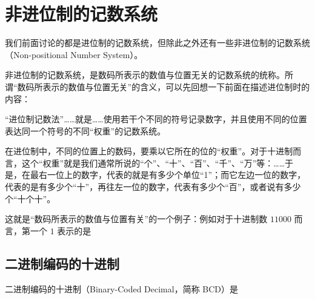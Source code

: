 \section{非进位制的记数系统}\label{sec:NumberSystemBasics/NonPositional}
    我们前面讨论的都是进位制的记数系统，但除此之外还有一些非进位制的记数系统（Non-positional Number System）。

    非进位制的记数系统，是数码所表示的数值与位置无关的记数系统的统称。所谓“数码所表示的数值与位置无关”的含义，可以先回想一下前面在描述进位制时的内容：

    \begin{displayquote}
        “进位制记数法”……就是……使用若干个不同的符号记录数字，并且使用不同的位置表达同一个符号的不同“权重”的记数系统。

        在进位制中，不同的位置上的数码，要乘以它所在的位的“权重”。对于十进制而言，这个“权重”就是我们通常所说的“个”、“十”、“百”、“千”、“万”等：……于是，在最右一位上的数字，代表的就是有多少个单位“1”；而它左边一位的数字，代表的是有多少个“十”，再往左一位的数字，代表有多少个“百”，或者说有多少个“十个十”。
    \end{displayquote}

    这就是“数码所表示的数值与位置有关”的一个例子：例如对于十进制数 $11000$ 而言，第一个 $1$ 表示的是

    \subsection{二进制编码的十进制}\label{subsec:NumberSystemBasics/NonPositional/BinaryCodedDecimal}
        二进制编码的十进制（Binary-Coded Decimal，简称 BCD）是
